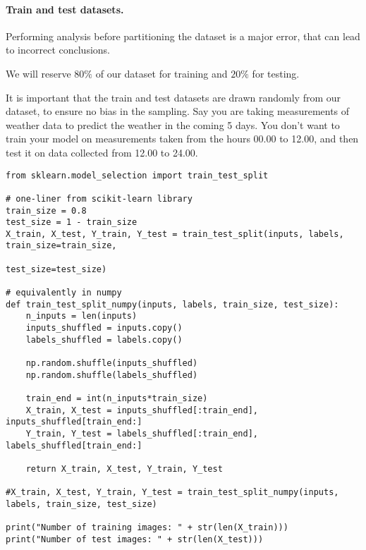 \paragraph{Train and test datasets.}
Performing analysis before partitioning the dataset is a major error, that can lead to incorrect conclusions.  

We will reserve $80 \%$ of our dataset for training and $20 \%$ for testing.  

It is important that the train and test datasets are drawn randomly from our dataset, to ensure
no bias in the sampling.  
Say you are taking measurements of weather data to predict the weather in the coming 5 days.
You don't want to train your model on measurements taken from the hours 00.00 to 12.00, and then test it on data
collected from 12.00 to 24.00.





























\begin{verbatim}
from sklearn.model_selection import train_test_split

# one-liner from scikit-learn library
train_size = 0.8
test_size = 1 - train_size
X_train, X_test, Y_train, Y_test = train_test_split(inputs, labels, train_size=train_size,
                                                    test_size=test_size)

# equivalently in numpy
def train_test_split_numpy(inputs, labels, train_size, test_size):
    n_inputs = len(inputs)
    inputs_shuffled = inputs.copy()
    labels_shuffled = labels.copy()
    
    np.random.shuffle(inputs_shuffled)
    np.random.shuffle(labels_shuffled)
    
    train_end = int(n_inputs*train_size)
    X_train, X_test = inputs_shuffled[:train_end], inputs_shuffled[train_end:]
    Y_train, Y_test = labels_shuffled[:train_end], labels_shuffled[train_end:]
    
    return X_train, X_test, Y_train, Y_test

#X_train, X_test, Y_train, Y_test = train_test_split_numpy(inputs, labels, train_size, test_size)

print("Number of training images: " + str(len(X_train)))
print("Number of test images: " + str(len(X_test)))

\end{verbatim}


